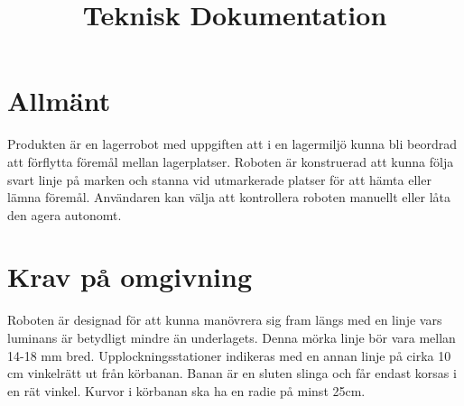 \documentclass[a4paper,12pt]{article}
\title{Teknisk Dokumentation}
\renewcommand{\thepage}{\roman{page}}
\begin{document}
\LIPStitelsida

\begin{LIPSprojektidentitet}
\end{LIPSprojektidentitet}


\renewcommand*\contentsname{Innehåll}
\begin{spacing}{0.5}
\tableofcontents{}
\end{spacing}
\newpage

\begin{LIPSdokumenthistorik}
\end{LIPSdokumenthistorik}
\newpage

\renewcommand{\thepage}{\arabic{page}}
\setcounter{page}{1}

\section{Allmänt}
Produkten är en lagerrobot med uppgiften att i en lagermiljö kunna bli beordrad att förflytta föremål mellan lagerplatser. Roboten är konstruerad att kunna följa svart linje på marken och stanna vid utmarkerade platser för att hämta eller lämna föremål. Användaren kan välja att kontrollera roboten manuellt eller låta den agera autonomt.

\section{Krav på omgivning}
Roboten är designad för att kunna manövrera sig fram längs med en linje vars luminans är betydligt mindre än underlagets. Denna mörka linje bör vara mellan 14-18 mm bred. Upplockningsstationer indikeras med en annan linje på cirka 10 cm vinkelrätt ut från körbanan. Banan är en sluten slinga och får endast korsas i en rät vinkel. Kurvor i körbanan ska ha en radie på minst 25cm. 
\end{document}

